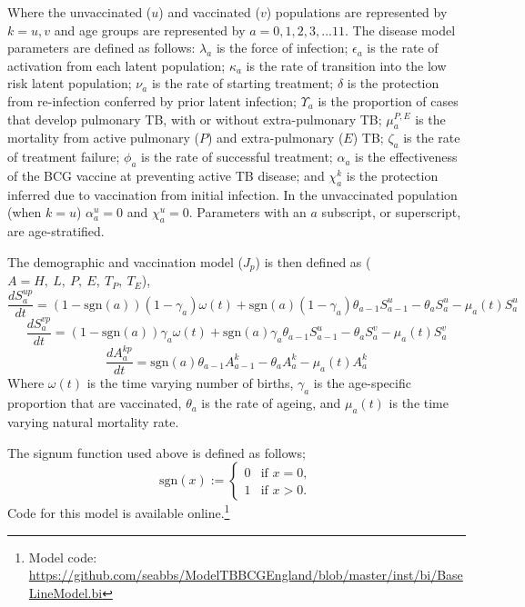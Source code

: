 \documentclass[11pt,twoside]{bristolthesis}
\begin{document}
  Where the unvaccinated (\(u\)) and vaccinated (\(v\)) populations are represented by \(k = u,v\) and age groups are represented by \(a=0,1,2,3, ... 11\). The disease model parameters are defined as follows: \(\lambda_a\) is the force of infection; \(\epsilon_a\) is the rate of activation from each latent population; \(\kappa_a\) is the rate of transition into the low risk latent population; \(\nu_a\) is the rate of starting treatment; \(\delta\) is the protection from re-infection conferred by prior latent infection; \(\Upsilon_a\) is the proportion of cases that develop pulmonary TB, with or without extra-pulmonary TB; \(\mu^{P,E}_a\) is the mortality from active pulmonary (\(P\)) and extra-pulmonary (\(E\)) TB; \(\zeta_a\) is the rate of treatment failure; \(\phi_a\) is the rate of successful treatment; \(\alpha_a\) is the effectiveness of the BCG vaccine at preventing active TB disease; and \(\chi^k_a\) is the protection inferred due to vaccination from initial infection. In the unvaccinated population (when \(k=u\)) \(\alpha^u_a = 0\) and \(\chi^u_a = 0\). Parameters with an \(a\) subscript, or superscript, are age-stratified.
  
  The demographic and vaccination model (\(J_{p}\)) is then defined as (\(A = H,\ L,\ P,\ E,\ T_P,\ T_E\)),
  \begin{equation}
  \frac{dS^{up}_{a}}{dt} = (1 - \text{sgn}(a)) (1 - \gamma_a)\omega(t) + \text{sgn}(a) (1 - \gamma_a)\theta_{a - 1} S^u_{a - 1} - \theta_a S^u_a -\mu_{a}(t) S^u_a
    \label{eq:sus-age-u-model}
  \end{equation}
  \begin{equation}
  \frac{dS^{vp}_{a}}{dt} = (1 - \text{sgn}(a)) \gamma_a\omega(t) + \text{sgn}(a)\gamma_a\theta_{a - 1} S^u_{a - 1} - \theta_a S^v_a -\mu_{a}(t) S^v_a
    \label{eq:sus-age-v-model}
  \end{equation}
  \begin{equation}
  \frac{dA^{kp}_{a}}{dt} = \text{sgn}(a)\theta_{a - 1} A^k_{a - 1} - \theta_a A^k_{a} - \mu_{a}(t) A^k_{a}
    \label{eq:other-age-model}
  \end{equation}
  Where \(\omega(t)\) is the time varying number of births, \(\gamma_a\) is the age-specific proportion that are vaccinated, \(\theta_a\) is the rate of ageing, and \(\mu_a(t)\) is the time varying natural mortality rate.
  
  The signum function used above is defined as follows;
  \begin{equation}
  \text{sgn}(x) := \begin{cases}
  0 & \text{if } x = 0, \\
  1 & \text{if } x > 0. \end{cases}
    \label{eq:signum}
  \end{equation}
  Code for this model is available online.\footnote{Model code: \url{https://github.com/seabbs/ModelTBBCGEngland/blob/master/inst/bi/BaseLineModel.bi}}
  
\end{document}
